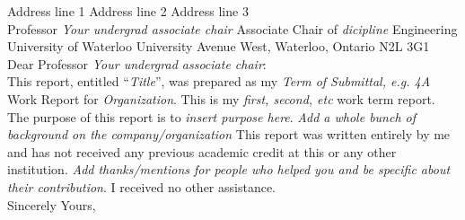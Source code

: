 {
\noindent
Address line 1\newline
Address line 2\newline
Address line 3\newline
\dateofsubmittal{}\\

\noindent
Professor \textit{Your undergrad associate chair}\newline
Associate Chair of \textit{dicipline} Engineering\newline
\department\newline
University of Waterloo University Avenue West,\newline
Waterloo, Ontario\newline
N2L 3G1\\

\noindent
Dear Professor \textit{Your undergrad associate chair}:\\

\noindent
This report, entitled “\textit{Title}”, was prepared as my \textit{Term of Submittal, e.g. 4A} Work Report for \textit{Organization}. This is my \textit{first, second, etc} work term report. The purpose of this report is to \textit{insert purpose here}. \textit{Add a whole bunch of background on the company/organization} This report was written entirely by me and has not received any previous academic credit at this or any other institution. \textit{Add thanks/mentions for people who helped you and be specific about their contribution}. I received no other assistance.\\

\noindent Sincerely Yours,\bigbreak\bigbreak\bigbreak\bigbreak
\noindent\yourname
\par}
